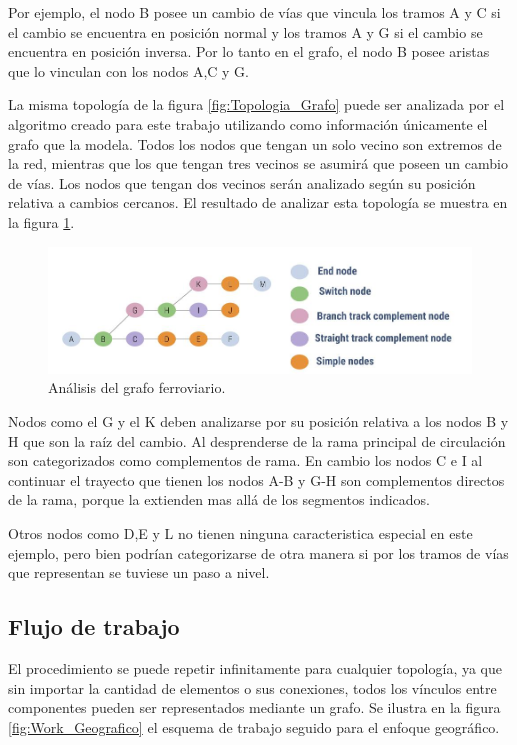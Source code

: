 		Por ejemplo, el nodo B posee un cambio de vías que vincula los tramos A y C si el cambio se encuentra en posición normal y los tramos A y G si el cambio se encuentra en posición inversa. Por lo tanto en el grafo, el nodo B posee aristas que lo vinculan con los nodos A,C y G.
		
		La misma topología de la figura \ref{fig:Topologia_Grafo} puede ser analizada por el algoritmo creado para este trabajo utilizando como información únicamente el grafo que la modela. Todos los nodos que tengan un solo vecino son extremos de la red, mientras que los que tengan tres vecinos se asumirá que poseen un cambio de vías. Los nodos que tengan dos vecinos serán analizado según su posición relativa a cambios cercanos. El resultado de analizar esta topología se muestra en la figura \ref{fig:Grafo_Analisis}.
	
		\begin{figure}[h]
		\centering
			\includegraphics[scale=.4]{./Figures/Grafo}
			\caption{Análisis del grafo ferroviario.}
			\label{fig:Grafo_Analisis}
		\end{figure}
	
		Nodos como el G y el K deben analizarse por su posición relativa a los nodos B y H que son la raíz del cambio. Al desprenderse de la rama principal de circulación son categorizados como complementos de rama. En cambio los nodos C e I al continuar el trayecto que tienen los nodos A-B y G-H son complementos directos de la rama, porque la extienden mas allá de los segmentos indicados.
		
		Otros nodos como D,E y L no tienen ninguna caracteristica especial en este ejemplo, pero bien podrían categorizarse de otra manera si por los tramos de vías que representan se tuviese un paso a nivel.
	
		\subsection{Flujo de trabajo}
		
		El procedimiento se puede repetir infinitamente para cualquier topología, ya que sin importar la cantidad de elementos o sus conexiones, todos los vínculos entre componentes pueden ser representados mediante un grafo. Se ilustra en la figura \ref{fig:Work_Geografico} el esquema de trabajo seguido para el enfoque geográfico.	
		

